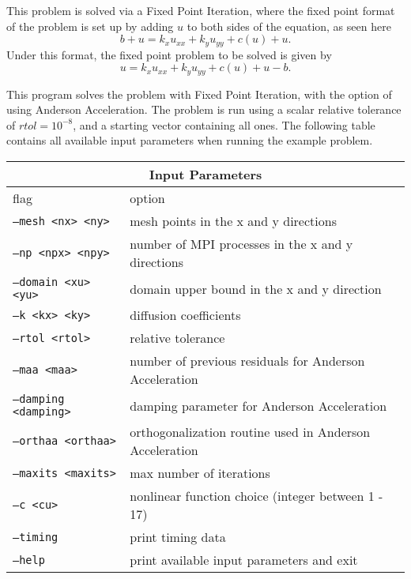 This problem is solved via a Fixed Point Iteration, where the fixed point format
of the problem is set up by adding $u$ to both sides of the equation, as
seen here
\begin{equation}
    b + u = k_x u_{xx} + k_y u_{yy} + c(u) + u.
\end{equation}
Under this format, the fixed point problem to be solved is given by
\begin{equation}
    u = k_x u_{xx} + k_y u_{yy} + c(u) + u - b.
\end{equation}

This program solves the problem with Fixed Point Iteration, 
with the option of using Anderson Acceleration.
The problem is run using a scalar relative
tolerance of $rtol=10^{-8}$, and a starting vector
containing all ones. 
The following table contains all available input parameters
when running the example problem.

\begin{center}
\begin{tabular}{ |p{5cm}||p{10cm}| }
\hline
\multicolumn{2}{|c|}{Input Parameters} \\
\hline
flag & option \\
\hline
{\tt --mesh <nx> <ny>} & mesh points in the x and y directions\\
{\tt --np <npx> <npy>} & number of MPI processes in the x and y directions\\
{\tt --domain <xu> <yu>} & domain upper bound in the x and y direction\\
{\tt --k <kx> <ky>} & diffusion coefficients\\
{\tt --rtol <rtol>} & relative tolerance\\
{\tt --maa <maa>} & number of previous residuals for Anderson Acceleration \\
{\tt --damping <damping>} & damping parameter for Anderson Acceleration \\
{\tt --orthaa <orthaa>} & orthogonalization routine used in Anderson Acceleration \\
{\tt --maxits <maxits>} & max number of iterations \\
{\tt --c <cu>} & nonlinear function choice (integer between 1 - 17)\\
{\tt --timing} & print timing data\\
{\tt --help} & print available input parameters and exit\\
\hline
\end{tabular}
\end{center}

